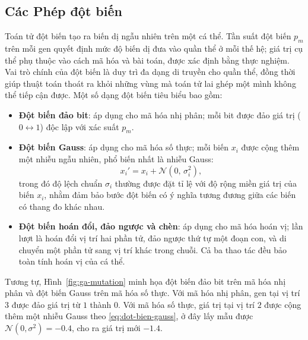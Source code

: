 \subsection*{Các Phép đột biến}
\label{subsec:dot-bien}

Toán tử đột biến tạo ra biến dị ngẫu nhiên trên một cá thể. Tần suất
đột biến $p_m$ trên mỗi gen quyết định mức độ biến dị đưa vào quần
thể ở mỗi thế hệ; giá trị cụ thể phụ thuộc vào cách mã hóa và bài toán,
được xác định bằng thực nghiệm. Vai trò chính của đột biến là duy
trì đa dạng di truyền cho quần thể, đồng thời giúp thuật toán thoát ra
khỏi những vùng mà toán tử lai ghép một mình không thể tiếp cận được.
Một số dạng đột biến tiêu biểu bao gồm:
\begin{itemize}
    \item \textbf{Đột biến đảo bit}: áp dụng cho mã
    hóa nhị phân; mỗi bit được đảo giá trị ($0 \leftrightarrow 1$) độc
    lập với xác suất $p_m$.
    \item \textbf{Đột biến Gauss}: áp dụng cho mã
    hóa số thực; mỗi biến $x_i$ được cộng thêm một nhiễu ngẫu nhiên, phổ
    biến nhất là nhiễu Gauss:
    \begin{equation}
    x_i' = x_i + \mathcal{N}(0,\, \sigma_i^2),
    \label{eq:dot-bien-gauss}
    \end{equation}
    trong đó độ lệch chuẩn $\sigma_i$ thường được đặt tỉ lệ với độ rộng
    miền giá trị của biến $x_i$, nhằm đảm bảo bước đột biến có ý nghĩa
    tương đương giữa các biến có thang đo khác nhau.
    \item \textbf{Đột biến hoán đổi, đảo ngược và chèn}: áp dụng cho mã hóa hoán vị; lần lượt là hoán
    đổi vị trí hai phần tử, đảo ngược thứ tự một đoạn con, và di chuyển
    một phần tử sang vị trí khác trong chuỗi. Cả ba thao tác đều bảo
    toàn tính hoán vị của cá thể.
\end{itemize}

Tương tự, Hình~\ref{fig:ga-mutation} minh họa đột biến đảo bit trên mã
hóa nhị phân và đột biến Gauss trên mã hóa số thực. Với mã hóa nhị
phân, gen tại vị trí $3$ được đảo giá trị từ $1$ thành $0$. Với mã hóa
số thực, giá trị tại vị trí $2$ được cộng thêm một nhiễu Gauss theo
\eqref{eq:dot-bien-gauss}, ở đây lấy mẫu được $\mathcal{N}(0,\sigma^2)
= -0.4$, cho ra giá trị mới $-1.4$.

